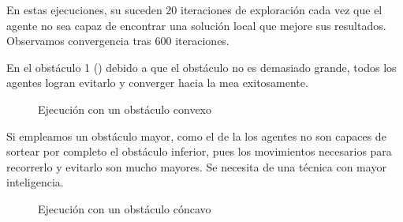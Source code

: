 En estas ejecuciones, su suceden 20 iteraciones de exploración cada vez que el agente no sea capaz de encontrar una solución local que mejore sus resultados. Observamos convergencia tras 600 iteraciones.

En el obstáculo 1 () debido a que el obstáculo no es demasiado grande, todos los agentes logran evitarlo y converger hacia la mea exitosamente.

\begin{figure}[htbp]
    \centering
    \caption{Ejecución con un obstáculo convexo}
    \label{fig:6}
\end{figure}

Si empleamos un obstáculo mayor, como el de la  los agentes no son capaces de sortear por completo el obstáculo inferior, pues los movimientos necesarios para recorrerlo y evitarlo son mucho mayores. Se necesita de una técnica con mayor inteligencia.

\begin{figure}[htbp]
    \centering
    \caption{Ejecución con un obstáculo cóncavo}
    \label{fig:8}
\end{figure}